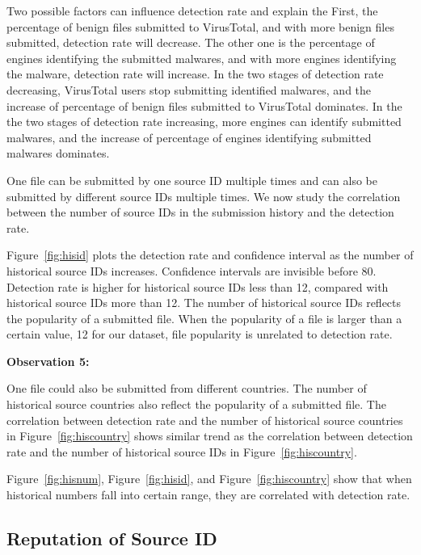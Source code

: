 Two possible factors can influence detection rate and explain the 
First, the percentage of benign files submitted to VirusTotal, 
and with more benign files submitted, detection rate will decrease.   
The other one is the percentage of engines identifying the submitted malwares, 
and with more engines identifying the malware, detection rate will increase. 
In the two stages of detection rate decreasing, 
VirusTotal users stop submitting identified malwares, 
and the increase of percentage of benign files submitted to VirusTotal dominates. 
In the the two stages of detection rate increasing, 
more engines can identify submitted malwares, 
and the increase of percentage of engines identifying submitted malwares dominates. 

One file can be submitted by one source ID multiple times 
and can also be submitted by different source IDs multiple times. 
We now study the correlation between the number of source IDs in the submission history and the detection rate. 

Figure~\ref{fig:hisid} plots the detection rate and confidence interval as the number of historical source IDs increases. 
Confidence intervals are invisible before 80. 
Detection rate is higher for historical source IDs less than 12, compared with historical source IDs more than 12.
The number of historical source IDs reflects the popularity of a submitted file.
When the popularity of a file is larger than a certain value, 12 for our dataset, 
file popularity is unrelated to detection rate. 

{\bf Observation 5:} 
{\em }

One file could also be submitted from different countries. 
The number of historical source countries also reflect the popularity of a submitted file. 
The correlation between detection rate and the number of historical source countries in 
Figure~\ref{fig:hiscountry} shows similar trend as the correlation between detection rate 
and the number of historical source IDs in Figure~\ref{fig:hiscountry}. 

Figure~\ref{fig:hisnum}, Figure~\ref{fig:hisid}, and Figure~\ref{fig:hiscountry} show that 
when historical numbers fall into certain range, they are correlated with detection rate. 
\fi

\subsection{Reputation of Source ID}
\label{sec:reputation}

